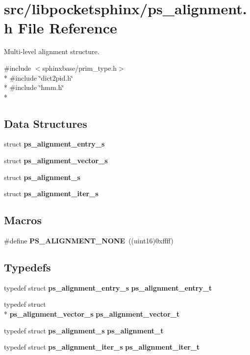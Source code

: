 \section{src/libpocketsphinx/ps\-\_\-alignment.h File Reference}
\label{ps__alignment_8h}


Multi-\/level alignment structure.  


{\ttfamily \#include $<$sphinxbase/prim\-\_\-type.\-h$>$}\\*
{\ttfamily \#include \char`\"{}dict2pid.\-h\char`\"{}}\\*
{\ttfamily \#include \char`\"{}hmm.\-h\char`\"{}}\\*
\subsection*{Data Structures}
\begin{DoxyCompactItemize}
\item 
struct {\bf ps\-\_\-alignment\-\_\-entry\-\_\-s}
\item 
struct {\bf ps\-\_\-alignment\-\_\-vector\-\_\-s}
\item 
struct {\bf ps\-\_\-alignment\-\_\-s}
\item 
struct {\bf ps\-\_\-alignment\-\_\-iter\-\_\-s}
\end{DoxyCompactItemize}
\subsection*{Macros}
\begin{DoxyCompactItemize}
\item 
\#define {\bfseries P\-S\-\_\-\-A\-L\-I\-G\-N\-M\-E\-N\-T\-\_\-\-N\-O\-N\-E}~((uint16)0xffff)\label{ps__alignment_8h_aa6ddcfcd7598f1b50582dd5489e63e50}

\end{DoxyCompactItemize}
\subsection*{Typedefs}
\begin{DoxyCompactItemize}
\item 
typedef struct {\bf ps\-\_\-alignment\-\_\-entry\-\_\-s} {\bfseries ps\-\_\-alignment\-\_\-entry\-\_\-t}\label{ps__alignment_8h_abf89e73906a29024da48581f645e3c98}

\item 
typedef struct \\*
{\bf ps\-\_\-alignment\-\_\-vector\-\_\-s} {\bfseries ps\-\_\-alignment\-\_\-vector\-\_\-t}\label{ps__alignment_8h_a57f06576e882630108c834e1a53a46d7}

\item 
typedef struct {\bf ps\-\_\-alignment\-\_\-s} {\bfseries ps\-\_\-alignment\-\_\-t}\label{ps__alignment_8h_a62983def0c01226bda91e6794a7f61f1}

\item 
typedef struct {\bf ps\-\_\-alignment\-\_\-iter\-\_\-s} {\bfseries ps\-\_\-alignment\-\_\-iter\-\_\-t}\label{ps__alignment_8h_afe48426a7d6bd0d7af628c4efc877ad8}

\end{DoxyCompactItemize}

